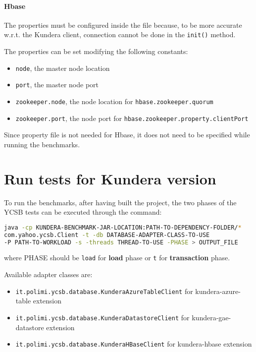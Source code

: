 \paragraph{Hbase}
The properties must be configured inside the file because, to be more accurate w.r.t. the Kundera client, connection cannot be done in the \texttt{init()} method. 

\noindent The properties can be set modifying the following constants:
\begin{itemize}
\item \texttt{node}, the master node location
\item \texttt{port}, the master node port
\item \texttt{zookeeper.node}, the node location for \texttt{hbase.zookeeper.quorum}
\item \texttt{zookeeper.port}, the node port for \texttt{hbase.zookeeper.property.clientPort}
\end{itemize}

\noindent Since property file is not needed for Hbase, it does not need to be specified while running the benchmarks.

\section{Run tests for Kundera version}
\label{appendix:ycsb-kundera}
To run the benchmarks, after having built the project, the two phases of the YCSB tests can be executed through the command:

\begin{lstlisting}[language=bash, caption=Run Kundera clients benchmarks, numbers=none]
java -cp KUNDERA-BENCHMARK-JAR-LOCATION:PATH-TO-DEPENDENCY-FOLDER/*
com.yahoo.ycsb.Client -t -db DATABASE-ADAPTER-CLASS-TO-USE
-P PATH-TO-WORKLOAD -s -threads THREAD-TO-USE -PHASE > OUTPUT_FILE
\end{lstlisting}

\noindent where PHASE should be \texttt{load} for \textbf{load} phase or \texttt{t} for \textbf{transaction} phase.

\newparagraph Available adapter classes are:
\begin{itemize}
\item \texttt{it.polimi.ycsb.database.KunderaAzureTableClient} for kundera-azure-table extension
\item \texttt{it.polimi.ycsb.database.KunderaDatastoreClient} for kundera-gae-datastore extension
 \item\texttt{it.polimi.ycsb.database.KunderaHBaseClient} for kundera-hbase extension
\end{itemize}

